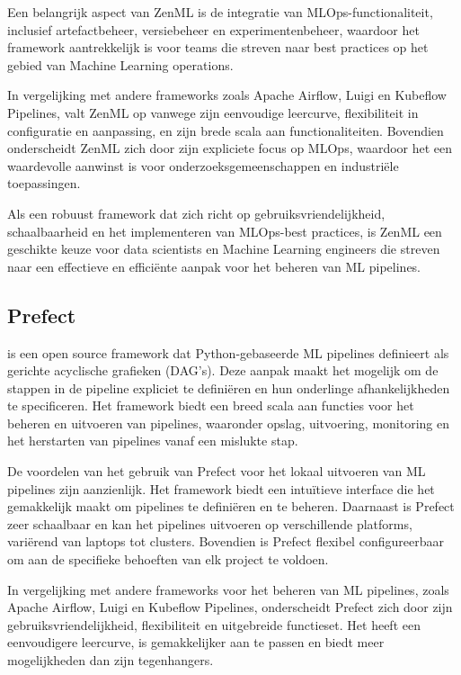 Een belangrijk aspect van ZenML is de integratie van MLOps-functionaliteit, inclusief artefactbeheer, versiebeheer en experimentenbeheer, waardoor het framework aantrekkelijk is voor teams die streven naar best practices op het gebied van Machine Learning operations.

In vergelijking met andere frameworks zoals Apache Airflow, Luigi en Kubeflow Pipelines, valt ZenML op vanwege zijn eenvoudige leercurve, flexibiliteit in configuratie en aanpassing, en zijn brede scala aan functionaliteiten. Bovendien onderscheidt ZenML zich door zijn expliciete focus op MLOps, waardoor het een waardevolle aanwinst is voor onderzoeksgemeenschappen en industriële toepassingen.

Als een robuust framework dat zich richt op gebruiksvriendelijkheid, schaalbaarheid en het implementeren van MLOps-best practices, is ZenML een geschikte keuze voor data scientists en Machine Learning engineers die streven naar een effectieve en efficiënte aanpak voor het beheren van ML pipelines.


\subsection{Prefect}

\textcite{Prefect2024} is een open source framework dat Python-gebaseerde ML pipelines definieert als gerichte acyclische grafieken (DAG's). Deze aanpak maakt het mogelijk om de stappen in de pipeline expliciet te definiëren en hun onderlinge afhankelijkheden te specificeren. Het framework biedt een breed scala aan functies voor het beheren en uitvoeren van pipelines, waaronder opslag, uitvoering, monitoring en het herstarten van pipelines vanaf een mislukte stap.

De voordelen van het gebruik van Prefect voor het lokaal uitvoeren van ML pipelines zijn aanzienlijk. Het framework biedt een intuïtieve interface die het gemakkelijk maakt om pipelines te definiëren en te beheren. Daarnaast is Prefect zeer schaalbaar en kan het pipelines uitvoeren op verschillende platforms, variërend van laptops tot clusters. Bovendien is Prefect flexibel configureerbaar om aan de specifieke behoeften van elk project te voldoen.

In vergelijking met andere frameworks voor het beheren van ML pipelines, zoals Apache Airflow, Luigi en Kubeflow Pipelines, onderscheidt Prefect zich door zijn gebruiksvriendelijkheid, flexibiliteit en uitgebreide functieset. Het heeft een eenvoudigere leercurve, is gemakkelijker aan te passen en biedt meer mogelijkheden dan zijn tegenhangers.

